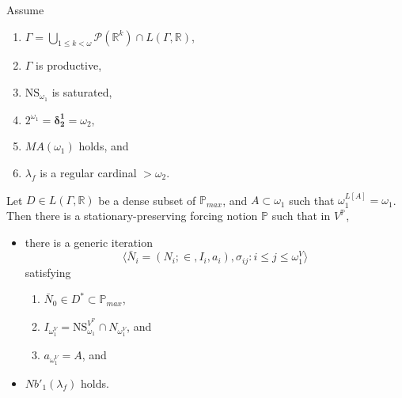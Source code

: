 \documentclass[12pt]{article}
\numberwithin{equation}{section}
\begin{document}
\begin{thm}\label{notion2}
Assume
\begin{enumerate}[label=(\roman*), leftmargin=40pt]
    \item\label{h1} $\Gamma  = \bigcup_{1 \leq k < \omega} \mathcal{P}(\mathbb{R}^{k}) \cap L(\Gamma, \mathbb{R})$,
    \item\label{h2} $\Gamma$ is productive,
    \item\label{h3} $\mathrm{NS}_{\omega_1}$ is saturated,
    \item\label{h4} $2^{\omega_1} = \mathbf{\delta^1_2} = \omega_2$, 
    \item\label{h5} $MA(\omega_1)$ holds, and
    \item\label{h7} $\lambda_f$ is a regular cardinal $> \omega_2$.
\end{enumerate}
Let $D \in L(\Gamma, \mathbb{R})$ be a dense subset of $\mathbb{P}_{max}$, and $A \subset \omega_1$ such that $\omega_1^{L[A]} = \omega_1$. Then there is a stationary-preserving forcing notion $\mathbb{P}$ such that in $V^{\mathbb{P}}$,
\begin{itemize}
    \item there is a generic iteration $$\langle \bar{N}_i = (N_i; \in, I_i, a_i), \sigma_{ij} : i \leq j \leq \omega_1^V \rangle$$ satisfying 
    \begin{enumerate}[label=(\arabic*), leftmargin=40pt]
        \item\label{nov1} $\bar{N}_0 \in D^* \subset \mathbb{P}_{max}$,
        \item\label{nov2} $I_{\omega_1^V} = \mathrm{NS}_{\omega_1}^{V^{\mathbb{P}}} \cap N_{\omega_1^V}$, and
        \item\label{nov3} $a_{\omega_1^V} = A$, and
    \end{enumerate}
    \item $Nb'_1(\lambda_f)$ holds.
\end{itemize}
\end{thm}
\end{document}
